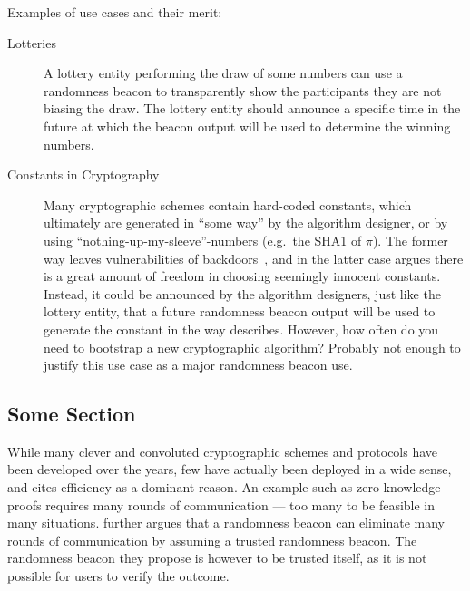 
Examples of use cases and their merit:
\begin{description}
    \item[Lotteries] A lottery entity performing the draw of some numbers can use a randomness beacon to transparently show the participants they are not biasing the draw.
    The lottery entity should announce a specific time in the future at which the beacon output will be used to determine the winning numbers.
    \item[Constants in Cryptography] Many cryptographic schemes contain hard-coded constants, which ultimately are generated in \enquote{some way} by the algorithm designer, or by using \enquote{nothing-up-my-sleeve}-numbers (e.g.\ the SHA1 of $\pi$).
    The former way leaves vulnerabilities of backdoors~, and in the latter case  argues there is a great amount of freedom in choosing seemingly innocent constants.
    Instead, it could be announced by the algorithm designers, just like the lottery entity, that a future randomness beacon output will be used to generate the constant in the way  describes.
    However, how often do you need to bootstrap a new cryptographic algorithm? Probably not enough to justify this use case as a major randomness beacon use.
\end{description}

\subsection{Some Section}

While many clever and convoluted cryptographic schemes and protocols have been developed over the years, few have actually been deployed in a wide sense, and  cites efficiency as a dominant reason.
An example such as zero-knowledge proofs requires many rounds of communication --- too many to be feasible in many situations.
 further argues that a randomness beacon can eliminate many rounds of communication by assuming a trusted randomness beacon.
The randomness beacon they propose is however to be trusted itself, as it is not possible for users to verify the outcome.

